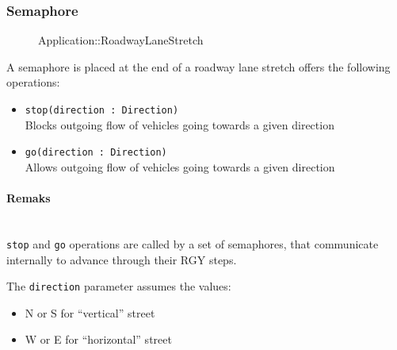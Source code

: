 \subsubsection{Semaphore}
\begin{figure}[h]
\centering
{}
\caption{Application::RoadwayLaneStretch}
\end{figure}
\FloatBarrier
A semaphore is placed at the end of a roadway lane stretch offers the following operations:
\begin{itemize}
	\item \texttt{stop(direction : Direction)}
	\\Blocks outgoing flow of vehicles going towards a given direction
	\item \texttt{go(direction : Direction)}
	\\Allows outgoing flow of vehicles going towards a given direction
\end{itemize}
\paragraph{Remaks}
\ \\\texttt{stop} and \texttt{go} operations are called by a set of semaphores, that communicate internally to advance through their RGY steps.

The \texttt{direction} parameter assumes the values:
\begin{itemize}
	\item N or S  for “vertical” street
	\item W or E for “horizontal” street
\end{itemize}